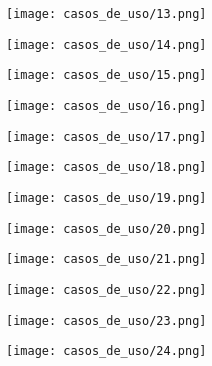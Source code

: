 \documentclass[12pt, spanish]{article}
\begin{document}
\pagebreak
\begin{centering}\texttt{[image: casos\_de\_uso/13.png]}\\[1.0 cm]\end{centering}
\pagebreak
\begin{centering}\texttt{[image: casos\_de\_uso/14.png]}\\[1.0 cm]\end{centering}
\pagebreak
\begin{centering}\texttt{[image: casos\_de\_uso/15.png]}\\[1.0 cm]\end{centering}
\pagebreak
\begin{centering}\texttt{[image: casos\_de\_uso/16.png]}\\[1.0 cm]\end{centering}
\pagebreak
\begin{centering}\texttt{[image: casos\_de\_uso/17.png]}\\[1.0 cm]\end{centering}
\pagebreak
\begin{centering}\texttt{[image: casos\_de\_uso/18.png]}\\[1.0 cm]\end{centering}
\pagebreak
\begin{centering}\texttt{[image: casos\_de\_uso/19.png]}\\[1.0 cm]\end{centering}
\pagebreak
\begin{centering}\texttt{[image: casos\_de\_uso/20.png]}\\[1.0 cm]\end{centering}
\pagebreak
\begin{centering}\texttt{[image: casos\_de\_uso/21.png]}\\[1.0 cm]\end{centering}
\pagebreak
\begin{centering}\texttt{[image: casos\_de\_uso/22.png]}\\[1.0 cm]\end{centering}
\pagebreak
\begin{centering}\texttt{[image: casos\_de\_uso/23.png]}\\[1.0 cm]\end{centering}
\pagebreak
\begin{centering}\texttt{[image: casos\_de\_uso/24.png]}\\[1.0 cm]\end{centering}
\end{document}
